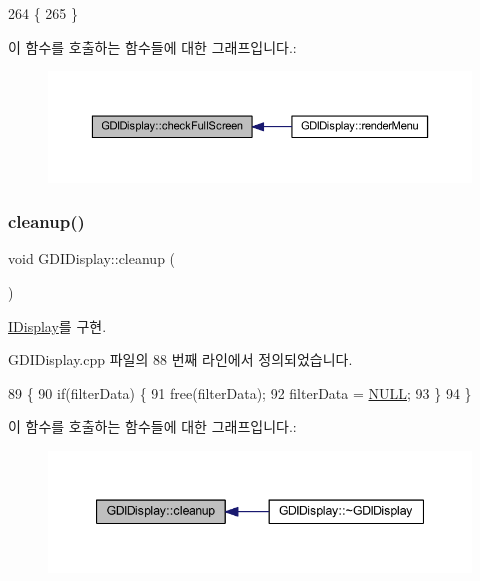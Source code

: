 \begin{DoxyCode}
264 \{
265 \}
\end{DoxyCode}
이 함수를 호출하는 함수들에 대한 그래프입니다.\+:
\nopagebreak
\begin{figure}[H]
\begin{center}
\leavevmode
\includegraphics[width=350pt]{class_g_d_i_display_a515bce84bcfc615fe0bb983f2ce3e20b_icgraph}
\end{center}
\end{figure}
\mbox{\label{class_g_d_i_display_ac1bee01ce5982ad75f5d8883133b0ee9}} 
\subsubsection{\texorpdfstring{cleanup()}{cleanup()}}
{\footnotesize\ttfamily void G\+D\+I\+Display\+::cleanup (\begin{DoxyParamCaption}{ }\end{DoxyParamCaption})\hspace{0.3cm}{\ttfamily [virtual]}}



\mbox{\hyperlink{class_i_display_a039e8c6b3f8fbee485fb895ef70e72c0}{I\+Display}}를 구현.



G\+D\+I\+Display.\+cpp 파일의 88 번째 라인에서 정의되었습니다.


\begin{DoxyCode}
89 \{
90   \textcolor{keywordflow}{if}(filterData) \{
91     free(filterData);
92     filterData = \mbox{\hyperlink{getopt1_8c_a070d2ce7b6bb7e5c05602aa8c308d0c4}{NULL}};
93   \}
94 \}
\end{DoxyCode}
이 함수를 호출하는 함수들에 대한 그래프입니다.\+:
\nopagebreak
\begin{figure}[H]
\begin{center}
\leavevmode
\includegraphics[width=347pt]{class_g_d_i_display_ac1bee01ce5982ad75f5d8883133b0ee9_icgraph}
\end{center}
\end{figure}
\mbox{\label{class_g_d_i_display_a68a4add7ba35706237739a587131f463}} 
